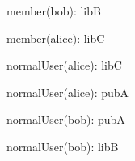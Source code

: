 \documentclass{article}
\begin{document}
{\begin{minipage}{\tableWidth}
\begin{description}[align=left,leftmargin=1em,noitemsep,labelsep=\parindent]
\item{{member(\allowbreak{}bob): libB}}
\item{{member(\allowbreak{}alice): libC}}
\item{{normalUser(\allowbreak{}alice): libC}}
\item{{normalUser(\allowbreak{}alice): pubA}}
\item{{normalUser(\allowbreak{}bob): pubA}}
\item{{normalUser(\allowbreak{}bob): libB}}
\end{description}\end{minipage}}
\end{document}
